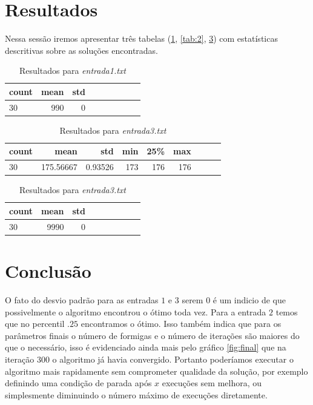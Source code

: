 \documentclass[10pt,twocolumn,letterpaper]{article}
\begin{document}
\section{Resultados}

Nessa sessão iremos apresentar três tabelas (\ref{tab:1}, \ref{tab:2}, \ref{tab:3}) com estatísticas descritivas sobre as soluções encontradas.

\begin{table}[H]
   \caption{Resultados para \textit{entrada1.txt}}
   \label{tab:1}
   \begin{tabular}{lrrrrrrrr}
      \toprule
      count & mean  & std \\
      \midrule
      30  & 990 & 0 \\
      \bottomrule
   \end{tabular}
\end{table}

\begin{table}[H]
   \caption{Resultados para \textit{entrada2.txt}}
   \label{tab:2}
   \begin{tabular}{lrrrrrrrr}
      \toprule
      count & mean       & std      & min   & 25\% &max   \\
      \midrule
      30  & 175.56667 & 0.93526 & 173 & 176 & 176 \\
      \bottomrule
   \end{tabular}

   \begin{table}[H]
   \end{table}
   \caption{Resultados para \textit{entrada3.txt}}\label{tab:3}

   \begin{tabular}{lrrrrrrrr}
      \toprule
      count & mean   & std \\
      \midrule
      30  & 9990 & 0 \\
      \bottomrule
   \end{tabular}

\end{table}


\section{Conclusão}

O fato do desvio padrão para as entradas $1$ e $3$ serem $0$ é um indicio de que possivelmente o algoritmo encontrou o ótimo toda vez. Para a entrada $2$ temos que no percentil $.25$ encontramos o ótimo. Isso também indica que para os parâmetros finais o número de formigas e o número de iterações são maiores do que o necessário, isso é evidenciado ainda mais pelo gráfico \ref{fig:final} que na iteração $300$ o algoritmo já havia convergido. Portanto poderíamos executar o algoritmo mais rapidamente sem comprometer qualidade da solução, por exemplo definindo uma condição de parada após $x$ execuções sem melhora, ou simplesmente diminuindo o número máximo de execuções diretamente.
\end{document}
